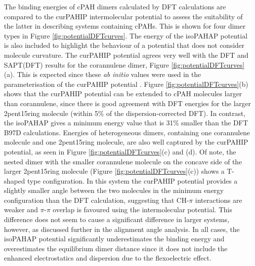 The binding energies of cPAH dimers calculated by DFT calculations are compared to the curPAHIP intermolecular potential to assess the suitability of the latter in describing systems containing cPAHs.  This is shown for four dimer types in Figure \ref{fig:potentialDFTcurves}.  The energy of the isoPAHAP potential is also included to highlight the behaviour of a potential that does not consider molecule curvature.
The curPAHIP potential agrees very well with the DFT and SAPT(DFT) results for the corannulene dimer, Figure \ref{fig:potentialDFTcurves}(a). This is expected since these \textit{ab initio} values were used in the parameterisation of the curPAHIP potential \cite{bowal2019ion}. 
Figure \ref{fig:potentialDFTcurves}(b) shows that the curPAHIP potential can be extended to cPAH molecules larger than corannulene, since there is good agreement with DFT energies for the larger 2pent15ring molecule (within 5\% of the dispersion-corrected DFT). In contrast, the isoPAHAP gives a minimum energy value that is 31\% smaller than the DFT B97D calculations.
Energies of heterogeneous dimers, containing one corannulene molecule and one 2pent15ring molecule, are also well captured by the curPAHIP potential, as seen in Figure \ref{fig:potentialDFTcurves}(c) and (d).  Of note, the nested dimer with the smaller corannulene molecule on the concave side of the larger 2pent15ring molecule (Figure \ref{fig:potentialDFTcurves}(c)) shows a T-shaped type configuration. In this system the curPAHIP potential provides a slightly smaller %
angle between the two molecules in the minimum energy configuration than the DFT calculation, suggesting that CH-$\pi$ interactions are weaker and $\pi$-$\pi$ overlap is favoured using the intermolecular potential.  This difference does not seem to cause a significant difference in larger systems, however, as discussed further in the alignment angle analysis. %
In all cases, the isoPAHAP potential significantly underestimates the binding energy and overestimates the equilibrium dimer distance since it does not include the enhanced electrostatics and dispersion due to the flexoelectric effect.
